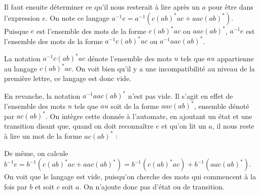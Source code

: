 \begin{example}
Il faut ensuite déterminer ce qu'il nous resterait à lire après un $a$ pour être dans l'expression $e$. On note ce langage $a^{-1}e = a^{-1}(c(ab)^*ac + aac(ab)^*)$.
Puisque $e$ est l'ensemble des mots de la forme $c(ab)^*ac$ ou $aac(ab)^*$, $a^{-1}e$ est l'ensemble des mots de la forme $a^{-1}c(ab)^*ac$ ou $a^{-1}aac(ab)^*$.

La notation $a^{-1}c(ab)^*ac$ dénote l'ensemble des mots $u$ tels que $au$ appartienne au langage $c(ab)^*ac$. On voit bien qu'il y a une incompatibilité au niveau de la première lettre, ce langage est donc vide.

En revanche, la notation $a^{-1}aac(ab)^*$ n'est pas vide. Il s'agit en effet de l'ensemble des mots $u$ tels que $au$ soit de la forme $aac(ab)^*$, ensemble dénoté par $ac(ab)^*$. On intègre cette donnée à l'automate, en ajoutant un état et une transition disant que, quand on doit reconnaître $e$ et qu'on lit un $a$, il nous reste à lire un mot de la forme $ac(ab)^*$ :



\begin{figure}[H]
\centering

\end{figure}

De même, on calcule $b^{-1}e = b^{-1}(c(ab)^*ac + aac(ab)^*) = b^{-1}(c(ab)^*ac) + b^{-1}(aac(ab)^*)$. On voit que le langage est vide, puisqu'on cherche des mots qui commencent à la fois par $b$ et soit $c$ soit $a$. On n'ajoute donc pas d'état ou de transition.


\end{example}
